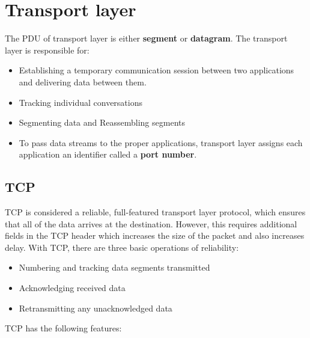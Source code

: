 \section{Transport layer}

The PDU of transport layer is either \textbf{segment} or \textbf{datagram}. The transport layer is responsible for:

\begin{itemize}
\item Establishing a temporary communication session between two applications and delivering data between them. 
\item Tracking individual conversations
\item Segmenting data and Reassembling segments
\item To pass data streams to the proper applications, transport layer assigns each application an identifier called a \textbf{port number}. 
\end{itemize}

\subsection{TCP}

TCP is considered a reliable, full-featured transport layer protocol, which ensures that all of the data arrives at the destination. However, this requires additional fields in the TCP header which increases the size of the packet and also increases delay. With TCP, there are three basic operations of reliability:

\begin{itemize}
\item Numbering and tracking data segments transmitted 
\item Acknowledging received data
\item Retransmitting any unacknowledged data 
\end{itemize}

TCP has the following features:

